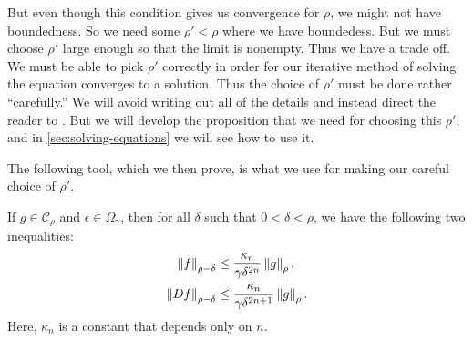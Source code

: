 \documentclass[twoside,letterpaper,11pt]{article}
\numberwithin{equation}{section}
\begin{document}
But even though this condition gives us convergence for $\rho$, we might not
have boundedness.
So we need some $\rho' < \rho$ where we have boundedess.
But we must choose $\rho'$ large enough so that the limit is nonempty.
Thus we have a trade off.
We must be able to pick $\rho'$ correctly in order for our iterative method of
solving the equation converges to a solution.
Thus the choice of $\rho'$ must be done rather ``carefully.''
We will avoid writing out all of the details and instead direct the reader to
\cite{hi02}.
But we will develop the proposition that we need for choosing this $\rho'$, and
in \cref{sec:solving-equations} we will see how to use it.

The following tool, which we then prove, is what we use for making our careful
choice of $\rho'$.
\begin{prop}
  \label{prop:tool}
  If $g \in \mathcal{C}_{\rho}$ and $\epsilon \in \Omega_{\gamma}$, then for all
  $\delta$ such that $0 < \delta < \rho$, we have the following two
  inequalities:
  \begin{align*}
    \norm{f}_{\rho - \delta} &\leq \frac{\kappa_n}{\gamma
                               \delta^{2n}}\norm{g}_{\rho},\\
    \norm{\Dif f}_{\rho - \delta} &\leq \frac{\kappa_n}{\gamma \delta^{2n + 1}}
                    \norm{g}_{\rho}.
  \end{align*}
  Here, $\kappa_n$ is a constant that depends only on $n$.
\end{prop}
\end{document}
